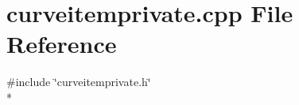 \section{curveitemprivate.\+cpp File Reference}
\label{curve_2curveitemprivate_8cpp}
{\ttfamily \#include \char`\"{}curveitemprivate.\+h\char`\"{}}\\*
